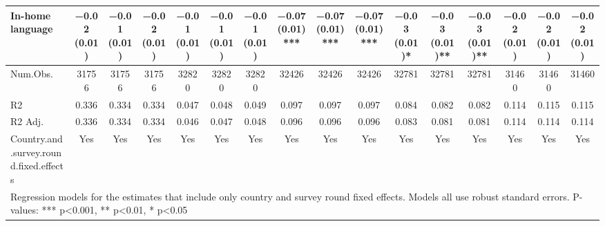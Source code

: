 \begin{table}[H]
\begin{tabular}[t]{lccccccccccccccc}
In-home language & \num{-0.02} (\num{0.01}) & \num{-0.01} (\num{0.01}) & \num{-0.02} (\num{0.01}) & \num{-0.01} (\num{0.01}) & \num{-0.01} (\num{0.01}) & \num{-0.01} (\num{0.01}) & \num{-0.07} (\num{0.01})*** & \num{-0.07} (\num{0.01})*** & \num{-0.07} (\num{0.01})*** & \num{-0.03} (\num{0.01})* & \num{-0.03} (\num{0.01})** & \num{-0.03} (\num{0.01})** & \num{-0.02} (\num{0.01}) & \num{-0.02} (\num{0.01}) & \num{-0.02} (\num{0.01})\\
\midrule
Num.Obs. & \num{31756} & \num{31756} & \num{31756} & \num{32820} & \num{32820} & \num{32820} & \num{32426} & \num{32426} & \num{32426} & \num{32781} & \num{32781} & \num{32781} & \num{31460} & \num{31460} & \num{31460}\\
R2 & \num{0.336} & \num{0.334} & \num{0.334} & \num{0.047} & \num{0.048} & \num{0.049} & \num{0.097} & \num{0.097} & \num{0.097} & \num{0.084} & \num{0.082} & \num{0.082} & \num{0.114} & \num{0.115} & \num{0.115}\\
R2 Adj. & \num{0.336} & \num{0.334} & \num{0.334} & \num{0.046} & \num{0.047} & \num{0.048} & \num{0.096} & \num{0.096} & \num{0.096} & \num{0.083} & \num{0.081} & \num{0.081} & \num{0.114} & \num{0.114} & \num{0.114}\\
Country.and.survey.round.fixed.effects & Yes & Yes & Yes & Yes & Yes & Yes & Yes & Yes & Yes & Yes & Yes & Yes & Yes & Yes & Yes\\
\bottomrule
\multicolumn{16}{l}{\rule{0pt}{1em}Regression models for the estimates that include only country and survey round fixed effects. Models all use robust standard errors. P-values: *** p<0.001, ** p<0.01, * p<0.05}\\
\end{tabular}
\end{table}
